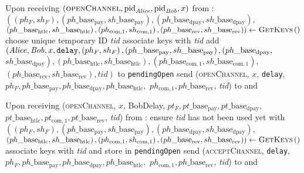 \begin{algorithmic}[1]
    \State Upon receiving $\left(\textsc{openChannel}, \mathrm{pid}_{\mathit{Alice}},
    \mathrm{pid}_{\mathit{Bob}}, x\right)$ from \environment:
    \Indent
      \State $\left(\left(ph_F, sh_F\right),
      \left(ph\_\mathrm{base}_{\mathrm{pay}},
      sh\_\mathrm{base}_{\mathrm{pay}}\right),
      \left(ph\_\mathrm{base}_{\mathrm{dpay}},
      sh\_\mathrm{base}_{\mathrm{dpay}}\right),\right.$
      $\left.\left(ph\_\mathrm{base}_{\mathrm{htlc}},
      sh\_\mathrm{base}_{\mathrm{htlc}}\right), \left(ph_{\mathrm{com}, 1},
      sh_{\mathrm{com}, 1}\right), \left(ph\_\mathrm{base}_{\mathrm{rev}},
      sh\_\mathrm{base}_{\mathrm{rev}}\right)\right) \gets
      \textsc{GetKeys}\left(\right)$ 
      \State choose unique temporary ID \textit{tid} 
      \State associate keys with \textit{tid}
      \State add $\left(\mathit{Alice}, \mathit{Bob}, x, \mathtt{delay}, \left(ph_F,
      sh_F\right), \left(ph\_\mathrm{base}_{\mathrm{pay}},
      sh\_\mathrm{base}_{\mathrm{pay}}\right),
      \left(ph\_\mathrm{base}_{\mathrm{dpay}},\right.\right.$
      $\left.\left.sh\_\mathrm{base}_{\mathrm{dpay}}\right),
      \left(ph\_\mathrm{base}_{\mathrm{htlc}},
      sh\_\mathrm{base}_{\mathrm{htlc}}\right),
      \left(ph\_\mathrm{base}_{\mathrm{com}, 1},
      sh\_\mathrm{base}_{\mathrm{com}, 1}\right),\right.$
      $\left.\left(ph\_\mathrm{base}_{\mathrm{rev}},
      sh\_\mathrm{base}_{\mathrm{rev}}\right), \mathit{tid}\right)$ to
      \texttt{pendingOpen}
      \State send (\textsc{openChannel}, $x$, \texttt{delay}, $ph_F,
      ph\_\mathrm{base}_{\mathrm{pay}}, ph\_\mathrm{base}_{\mathrm{dpay}},
      ph\_\mathrm{base}_{\mathrm{htlc}},$ $ph_{\mathrm{com}, 1},
      ph\_\mathrm{base}_{\mathrm{rev}}$, \textit{tid}) to \bob{} and \adversary
    \EndIndent
    \State

    \State Upon receiving (\textsc{openChannel}, $x$, BobDelay, $pt_F,
    pt\_\mathrm{base}_{\mathrm{pay}}, pt\_\mathrm{base}_{\mathrm{dpay}},$
    $pt\_\mathrm{base}_{\mathrm{htlc}}, pt_{\mathrm{com}, 1},
    pt\_\mathrm{base}_{\mathrm{rev}}$, \textit{tid}) from \bob:
    \Indent
      \State ensure \textit{tid} has not been used yet with \bob
      \State $\left(\left(ph_F, sh_F\right),
      \left(ph\_\mathrm{base}_{\mathrm{pay}},
      sh\_\mathrm{base}_{\mathrm{pay}}\right),
      \left(ph\_\mathrm{base}_{\mathrm{dpay}},
      sh\_\mathrm{base}_{\mathrm{dpay}}\right),\right.$
      $\left.\left(ph\_\mathrm{base}_{\mathrm{htlc}},
      sh\_\mathrm{base}_{\mathrm{htlc}}\right),
      \left(ph_{\mathrm{com}, 1}, sh_{\mathrm{com}, 1}\right),
      \left(ph\_\mathrm{base}_{\mathrm{rev}},
      sh\_\mathrm{base}_{\mathrm{rev}}\right)\right) \gets
      \textsc{GetKeys}\left(\right)$ 
      \State associate keys with \textit{tid} and store in \texttt{pendingOpen}
      \State send (\textsc{acceptChannel}, \texttt{delay}, $ph_F,
      ph\_\mathrm{base}_{\mathrm{pay}}, ph\_\mathrm{base}_{\mathrm{dpay}},
      ph\_\mathrm{base}_{\mathrm{htlc}},$ $ph_{\mathrm{com}, 1},
      ph\_\mathrm{base}_{\mathrm{rev}}$, \textit{tid}) to \bob{} and \adversary
    \EndIndent
    \State


\end{algorithmic}
